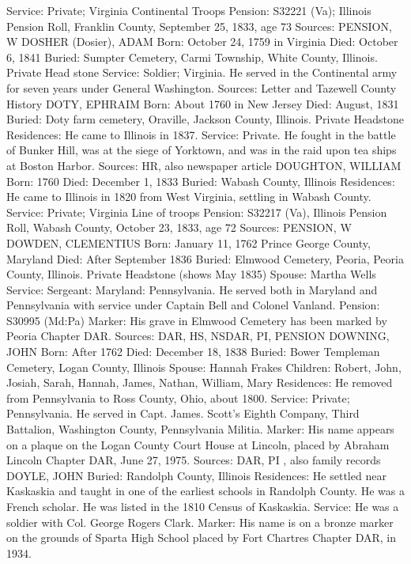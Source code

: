 Service: Private; Virginia Continental Troops 
Pension: S32221 (Va); Illinois Pension Roll, Franklin County, September 25, 1833, age 73 
Sources: PENSION, W
DOSHER (Dosier), ADAM
Born: October 24, 1759 in Virginia 
Died: October 6, 1841 
Buried: Sumpter Cemetery, Carmi Township, White County, Illinois. Private Head stone 
Service: Soldier; Virginia. He served in the Continental army for seven years under General Washington. 
Sources: Letter and Tazewell County History
DOTY, EPHRAIM 
Born: About 1760 in New Jersey 
Died: August, 1831 
Buried: Doty farm cemetery, Oraville, Jackson County, Illinois. Private Headstone 
Residences: He came to Illinois in 1837. 
Service: Private. He fought in the battle of Bunker Hill, was at the siege of  Yorktown, and was in the raid upon tea ships at Boston Harbor. 
Sources: HR, also newspaper article
DOUGHTON, WILLIAM 
Born: 1760 Died: December 1, 1833 
Buried: Wabash County, Illinois 
Residences: He came to Illinois in 1820 from West Virginia, settling in Wabash County. 
Service: Private; Virginia Line of troops 
Pension: S32217 (Va), Illinois Pension Roll, Wabash County, October 23, 1833, age 72 
Sources: PENSION, W 
DOWDEN, CLEMENTIUS
Born: January 11, 1762 Prince George County, Maryland 
Died: After September 1836 
Buried: Elmwood Cemetery, Peoria, Peoria County, Illinois. Private Headstone (shows May 1835) 
Spouse: Martha Wells 
Service: Sergeant: Maryland: Pennsylvania. He served both in Maryland and Pennsylvania with service under Captain Bell and Colonel Vanland. 
Pension: S30995 (Md:Pa) 
Marker: His grave in Elmwood Cemetery has been marked by Peoria Chapter DAR. 
Sources: DAR, HS, NSDAR, PI, PENSION 
DOWNING, JOHN 
Born: After 1762 
Died: December 18, 1838 
Buried: Bower Templeman Cemetery, Logan County, Illinois 
Spouse: Hannah Frakes 
Children: Robert, John, Josiah, Sarah, Hannah, James, Nathan, William, Mary 
Residences: He removed from Pennsylvania to Ross County, Ohio, about 1800. Service: Private; Pennsylvania. He served in Capt. James. Scott's Eighth Com­pany, Third Battalion, Washington County, Pennsylvania Militia. Marker: His name appears on a plaque on the Logan County Court House at Lincoln, placed by Abraham Lincoln Chapter DAR, June 27, 1975. 
Sources: DAR, PI , also family records 
DOYLE, JOHN 
Buried: Randolph County, Illinois 
Residences: He settled near Kaskaskia and taught in one of the earliest schools in Randolph County. He was a French scholar. He was listed in the 1810 Census of Kaskaskia. 
Service: He was a soldier with Col. George Rogers Clark. 
Marker: His name is on a bronze marker on the grounds of Sparta High School placed by Fort Chartres Chapter DAR, in 1934. 

